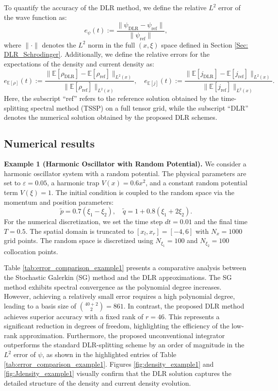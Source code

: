 \documentclass[preprint,11pt]{elsarticle}
\begin{document}
To quantify the accuracy of the DLR method, we define the relative $L^2$ error of the wave function as:
\begin{equation}
    e_{\psi}(t) := \frac{\| \psi_{\text{DLR}} - \psi_{\text{ref}} \|}{\| \psi_{\text{ref}} \|},
\end{equation}
where $\| \cdot \|$ denotes the $L^2$ norm in the full $(x, \xi)$ space defined in Section \ref{Sec: DLR_Schrodinger}. Additionally, we define the relative errors for the expectations of the density and current density as:
\begin{equation}
    e_{\mathbb{E}[\rho]}(t) := \frac{\| \mathbb{E}[\rho_{\text{DLR}}] - \mathbb{E}[\rho_{\text{ref}}] \|_{L^2(x)}}{\| \mathbb{E}[\rho_{\text{ref}}] \|_{L^2(x)}}, \quad 
    e_{\mathbb{E}[j]}(t) := \frac{\| \mathbb{E}[j_{\text{DLR}}] - \mathbb{E}[j_{\text{ref}}] \|_{L^2(x)}}{\| \mathbb{E}[j_{\text{ref}}] \|_{L^2(x)}}.
\end{equation}
Here, the subscript ``ref'' refers to the reference solution obtained by the time-splitting spectral method (TSSP) on a full tensor grid, while the subscript ``DLR'' denotes the numerical solution obtained by the proposed DLR schemes.


\subsection{Numerical results}
\textbf{Example 1 (Harmonic Oscillator with Random Potential).} 
We consider a harmonic oscillator system with a random potential. The physical parameters are set to $\varepsilon=0.05$, a harmonic trap $V(x)=0.6x^2$, and a constant random potential term $V(\xi)=1$. The initial condition is coupled to the random space via the momentum and position parameters:
\begin{equation*}
    \tilde{p}=0.7(\xi_1-\xi_2), \quad \tilde{q}=1+0.8(\xi_1+2\xi_2).
\end{equation*}
For the numerical discretization, we set the time step $dt=0.01$ and the final time $T=0.5$. The spatial domain is truncated to $[x_l, x_r] = [-4, 6]$ with $N_x=1000$ grid points. The random space is discretized using $N_{\xi_1}=100$ and $N_{\xi_2}=100$ collocation points.

Table \ref{tab:error_comparison_example1} presents a comparative analysis between the Stochastic Galerkin (SG) method and the DLR approximations. The SG method exhibits spectral convergence as the polynomial degree increases. However, achieving a relatively small error requires a high polynomial degree, leading to a basis size of $\binom{40 + 2}{2} = 861$. In contrast, the proposed DLR method achieves superior accuracy with a fixed rank of $r=46$. This represents a significant reduction in degrees of freedom, highlighting the efficiency of the low-rank approximation. Furthermore, the proposed unconventional integrator outperforms the standard DLR-splitting scheme by an order of magnitude in the $L^2$ error of $\psi$, as shown in the highlighted entries of Table \ref{tab:error_comparison_example1}. Figures \ref{fig:density_example1} and \ref{fig:Jdensity_example1} visually confirm that the DLR solution captures the detailed structure of the density and current density evolution.
\end{document}
